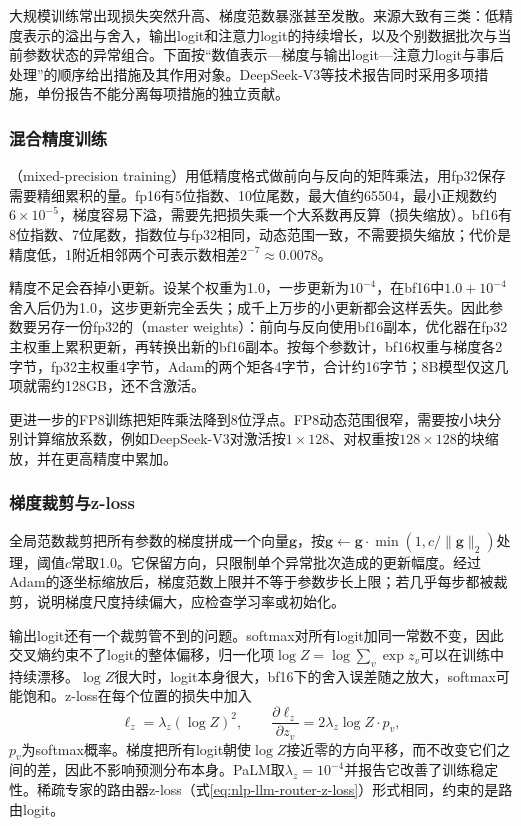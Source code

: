 大规模训练常出现损失突然升高、梯度范数暴涨甚至发散。来源大致有三类：低精度表示的溢出与舍入，输出logit和注意力logit的持续增长，以及个别数据批次与当前参数状态的异常组合。下面按“数值表示—梯度与输出logit—注意力logit与事后处理”的顺序给出措施及其作用对象。DeepSeek-V3等技术报告同时采用多项措施，单份报告不能分离每项措施的独立贡献。

\subsubsection{混合精度训练}
\label{sec:nlp-llm-mixed-precision}

（mixed-precision training）用低精度格式做前向与反向的矩阵乘法，用fp32保存需要精细累积的量。fp16有5位指数、10位尾数，最大值约65504，最小正规数约$6\times10^{-5}$，梯度容易下溢，需要先把损失乘一个大系数再反算（损失缩放）。bf16有8位指数、7位尾数，指数位与fp32相同，动态范围一致，不需要损失缩放；代价是精度低，1附近相邻两个可表示数相差$2^{-7}\approx0.0078$。

精度不足会吞掉小更新。设某个权重为1.0，一步更新为$10^{-4}$，在bf16中$1.0+10^{-4}$舍入后仍为1.0，这步更新完全丢失；成千上万步的小更新都会这样丢失。因此参数要另存一份fp32的（master weights）：前向与反向使用bf16副本，优化器在fp32主权重上累积更新，再转换出新的bf16副本。按每个参数计，bf16权重与梯度各2字节，fp32主权重4字节，Adam的两个矩各4字节，合计约16字节；8B模型仅这几项就需约128GB，还不含激活。

更进一步的FP8训练把矩阵乘法降到8位浮点。FP8动态范围很窄，需要按小块分别计算缩放系数，例如DeepSeek-V3对激活按$1\times128$、对权重按$128\times128$的块缩放，并在更高精度中累加。

\subsubsection{梯度裁剪与z-loss}
\label{sec:nlp-llm-zloss}

全局范数裁剪把所有参数的梯度拼成一个向量$\bm g$，按$\bm g\gets\bm g\cdot\min(1,c/\lVert\bm g\rVert_2)$处理，阈值$c$常取1.0。它保留方向，只限制单个异常批次造成的更新幅度。经过Adam的逐坐标缩放后，梯度范数上限并不等于参数步长上限；若几乎每步都被裁剪，说明梯度尺度持续偏大，应检查学习率或初始化。

输出logit还有一个裁剪管不到的问题。softmax对所有logit加同一常数不变，因此交叉熵约束不了logit的整体偏移，归一化项$\log Z=\log\sum_{v}\exp z_v$可以在训练中持续漂移。$\log Z$很大时，logit本身很大，bf16下的舍入误差随之放大，softmax可能饱和。z-loss在每个位置的损失中加入
\begin{equation}
 \ell_z=\lambda_z(\log Z)^2,\qquad
 \frac{\partial\ell_z}{\partial z_v}=2\lambda_z\log Z\cdot p_v,
 \label{eq:nlp-llm-zloss}
\end{equation}
$p_v$为softmax概率。梯度把所有logit朝使$\log Z$接近零的方向平移，而不改变它们之间的差，因此不影响预测分布本身。PaLM取$\lambda_z=10^{-4}$并报告它改善了训练稳定性。稀疏专家的路由器z-loss（式\eqref{eq:nlp-llm-router-z-loss}）形式相同，约束的是路由logit。

